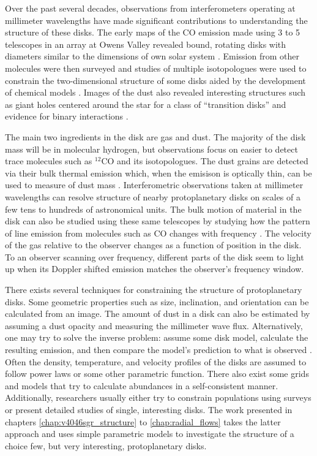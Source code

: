 Over the past several decades, observations from interferometers operating at millimeter wavelengths have made
significant contributions to understanding the structure of these disks.  The early maps of the CO emission
made using 3 to 5 telescopes in an array at Owens Valley revealed bound, rotating disks with diameters 
similar to the dimensions of own solar system \citep{sargent87,weintraub89,koerner93}.  Emission from other 
molecules were then surveyed \citep{dutrey97} and studies of multiple isotopologues were used to constrain the 
two-dimensional structure of some disks \citep{dartois03,pietu07,qi11} aided by the development of 
chemical models \citep{aikawa99,aikawa01}.  Images of the dust also revealed interesting structures such as
giant holes centered around the star for a class of ``transition disks'' \citep{hughes07,brown09,andrews11} and 
evidence for binary interactions \citep[i.e.][]{akeson98}.


The main two ingredients in the disk are gas and dust.  The majority of the disk mass will be in molecular 
hydrogen, but observations focus on easier to detect trace molecules such as $^{12}$CO and its isotopologues.
The dust grains are detected via their bulk thermal emission which, when the emisison is optically thin,  
can be used to measure of dust mass \citep{hildebrand83}.  Interferometric observations taken at 
millimeter wavelengths can resolve structure of nearby protoplanetary disks on scales of a few tens to 
hundreds of astronomical units.  The bulk motion of material in the disk can also be 
studied using these same telescopes by studying how the pattern of line emission
from molecules such as CO changes with frequency \citep{beckwith93}.  The velocity of the gas relative to the 
observer changes as a function of position in the disk. To an observer scanning over frequency, different parts 
of the disk seem to light up when its Doppler shifted emission matches the observer's frequency window.

There exists several techniques for constraining the structure of protoplanetary disks.  Some geometric 
properties such as size, inclination, and orientation can be calculated from an image.  The amount of dust 
in a disk can also be estimated by assuming a dust opacity and measuring the millimeter wave flux.  
Alternatively, one may try to solve the inverse problem: assume some disk model, calculate the resulting 
emission, and then compare the model's prediction to what is observed \citep[i.e.][]{dartois03,qi03}.  Often the 
density, temperature, and velocity profiles of the disks are assumed to 
follow power laws or some other parametric function.  There also exist some grids and models that try to 
calculate abundances in a self-consistent manner.  Additionally, researchers usually either try to constrain 
populations using 
surveys \citep[i.e.][]{andrews11,oberg11,harris12} or present detailed studies of single, 
interesting disks.  The work
presented in chapters \ref{chap:v4046sgr_structure} to \ref{chap:radial_flows} takes the latter approach and 
uses simple parametric 
models to investigate the structure of a choice few, but very interesting, protoplanetary disks.

